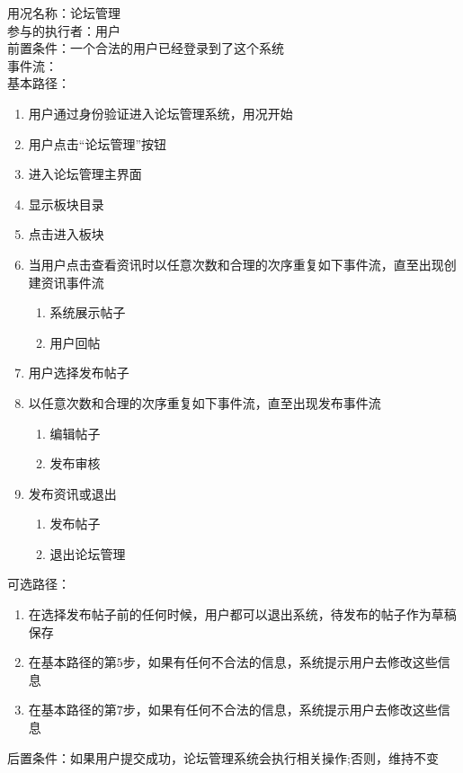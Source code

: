 \begin{framed}
\noindent
用况名称：论坛管理\\
参与的执行者：用户\\
前置条件：一个合法的用户已经登录到了这个系统\\
事件流：\\
基本路径：
\begin{enumerate}[itemsep=2pt,topsep=0pt,parsep=0pt,itemindent=1em]
    \item 用户通过身份验证进入论坛管理系统，用况开始
    \item 用户点击“论坛管理”按钮
    \item 进入论坛管理主界面
    \item 显示板块目录
    \item 点击进入板块
    \item 当用户点击查看资讯时以任意次数和合理的次序重复如下事件流，直至出现创建资讯事件流
    \begin{enumerate}[itemsep=2pt,topsep=0pt,parsep=0pt,itemindent=1em]
          \item 系统展示帖子
          \item 用户回帖
      \end{enumerate}
    \item 用户选择发布帖子
    \item 以任意次数和合理的次序重复如下事件流，直至出现发布事件流
    \begin{enumerate}[itemsep=2pt,topsep=0pt,parsep=0pt,itemindent=1em]
          \item 编辑帖子 
          \item 发布审核
      \end{enumerate}
    \item 发布资讯或退出
        \begin{enumerate}[itemsep=2pt,topsep=0pt,parsep=0pt,itemindent=1em]
          \item 发布帖子
          \item 退出论坛管理
      \end{enumerate}
\end{enumerate}
\noindent
可选路径：\par
   \begin{enumerate}[itemsep=2pt,topsep=0pt,parsep=0pt,itemindent=1em]  
       \item 在选择发布帖子前的任何时候，用户都可以退出系统，待发布的帖子作为草稿保存 
       \item 在基本路径的第$5$步，如果有任何不合法的信息，系统提示用户去修改这些信息
       \item 在基本路径的第$7$步，如果有任何不合法的信息，系统提示用户去修改这些信息  
   \end{enumerate} 
后置条件：如果用户提交成功，论坛管理系统会执行相关操作;否则，维持不变
\end{framed}

